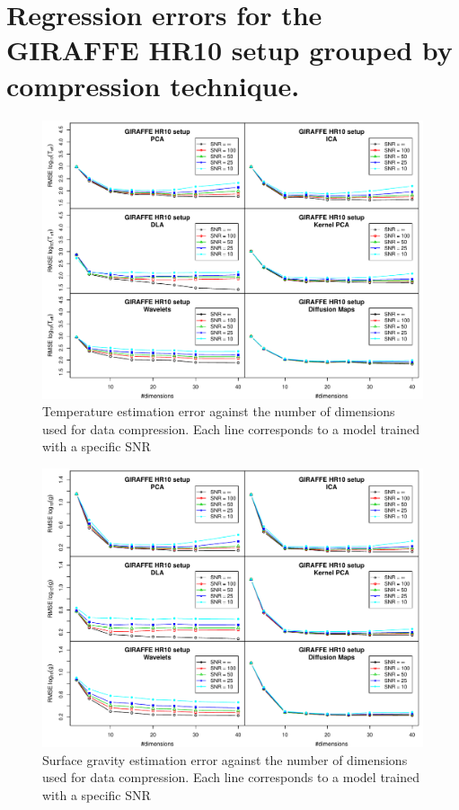 \documentclass[a4paper,fleqn,usenatbib]{mnras}
\begin{document}
{%

\appendix

\section{Regression errors for the GIRAFFE HR10 setup grouped by compression technique.}
\label{a1}
\begin{figure}
\centering\includegraphics[width=\textwidth]{flamesHR10_Teff_log_BestSVM_N-SNR-RMSE_test.pdf}
\caption{Temperature estimation error against the number of dimensions
  used for data compression. Each line corresponds to a model trained
  with a specific SNR}
\label{fig:methodsnrTeff}
\end{figure}

\begin{figure}
\centering\includegraphics[width=\textwidth]{flamesHR10_Logg_log_BestSVM_N-SNR-RMSE_test.pdf}
\caption{Surface gravity estimation error against the number of dimensions
  used for data compression. Each line corresponds to a model trained
  with a specific SNR}
\label{fig:methodsnrLogg}
\end{figure}

}
\end{document}
